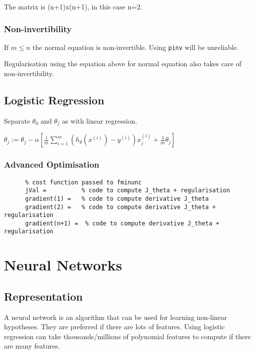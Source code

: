 \documentclass[12pt] {article}
\begin{document}
      The matrix is (n+1)x(n+1), in this case n=2.

    \subsubsection{Non-invertibility}

      If $m \leq n$ the normal equation is non-invertible. Using \texttt{pinv}
      will be unreliable. 

      Regularisation using the equation above for normal equation also takes
      care of non-invertibility. 

  \subsection{Logistic Regression}

    Separate $\theta_0 \text{ and } \theta_j$ as with linear regression.

    $\theta_j := \theta_j - \alpha [\frac{1}{m} \displaystyle\sum_{i=1}^m
    (h_\theta(x^{(i)}) - y^{(i)}) x_j^{(i)} + \frac{\lambda}{m} \theta_j]$

    \subsubsection{Advanced Optimisation}

      \begin{lstlisting}
      % cost function passed to fminunc
      jVal =          % code to compute J_theta + regularisation
      gradient(1) =   % code to compute derivative J_theta
      gradient(2) =   % code to compute derivative J_theta + regularisation
      gradient(n+1) =  % code to compute derivative J_theta + regularisation
      \end{lstlisting}

  \newpage

\section{Neural Networks}

  \subsection{Representation}

    A neural network is an algorithm that can be used for learning non-linear
    hypotheses. They are preferred if there are lots of features. Using 
    logistic regression can take thousands/millions of polynomial features 
    to compute if there are many features. 
\end{document}
